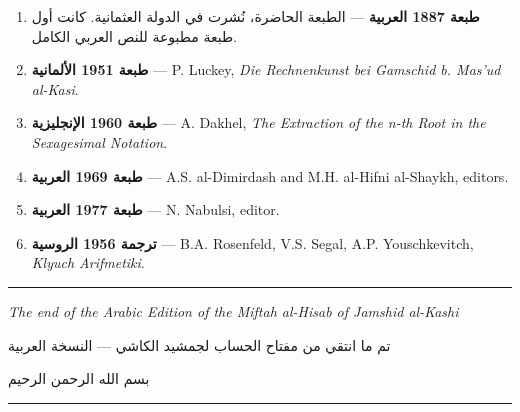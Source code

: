 \documentclass[11pt,a4paper]{book}
\newcommand{\ar}[1]{\arabicfont\beginR #1\endR}
\newcommand{\shortline}{\noindent\rule{0.5\textwidth}{0.4pt}\par}
\begin{document}
\begin{enumerate}[label=\arabic*.]
  \item \textbf{\ar{طبعة 1887 العربية}} — \ar{الطبعة الحاضرة، نُشرت في الدولة العثمانية. كانت أول طبعة مطبوعة للنص العربي الكامل.}
  \item \textbf{\ar{طبعة 1951 الألمانية}} — P. Luckey, \textit{Die Rechnenkunst bei Gamschid b. Mas'ud al-Kasi}.
  \item \textbf{\ar{طبعة 1960 الإنجليزية}} — A. Dakhel, \textit{The Extraction of the n-th Root in the Sexagesimal Notation}.
  \item \textbf{\ar{طبعة 1969 العربية}} — A.S. al-Dimirdash and M.H. al-Hifni al-Shaykh, editors.
  \item \textbf{\ar{طبعة 1977 العربية}} — N. Nabulsi, editor.
  \item \textbf{\ar{ترجمة 1956 الروسية}} — B.A. Rosenfeld, V.S. Segal, A.P. Youschkevitch, \textit{Klyuch Arifmetiki}.
\end{enumerate}

\vspace{0.5cm}

\begin{center}
\shortline

\vspace{0.5cm}

\textit{The end of the Arabic Edition of the \textit{Miftah al-Hisab} of Jamshid al-Kashi}

\vspace{0.3cm}

\ar{تم ما انتقي من مفتاح الحساب لجمشيد الكاشي — النسخة العربية}

\vspace{0.3cm}

\ar{بسم الله الرحمن الرحيم}

\vspace{0.5cm}

\shortline
\end{center}
\end{document}
